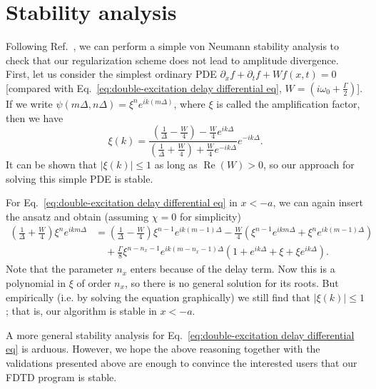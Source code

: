 \documentclass[final,1p,times]{elsarticle}
\DeclareMathOperator{\re}{Re}
\begin{document}
\appendix
\section{Stability analysis}
\label{appen: stability}
Following Ref.~\cite{NumericalRecipes}, we can perform a simple von Neumann stability analysis to check that our regularization scheme does not lead to amplitude divergence. First, let us consider the simplest ordinary PDE $\partial_x f+\partial_t f+W f(x,t)=0$ [compared with Eq.~\eqref{eq:double-excitation delay differential eq}, $W=\left(i\omega_0+\frac{\Gamma}{2}\right)$]. If we write $\psi(m\Delta, n\Delta)=\xi^n e^{ik(m\Delta)}$, where $\xi$ is called the amplification factor, then we have 
\begin{equation}
\xi(k) = \frac{\left(\frac{1}{\Delta}-\frac{W}{4}\right)-\frac{W}{4}e^{ik\Delta}}{\left(\frac{1}{\Delta}+\frac{W}{4}\right)+\frac{W}{4}e^{-ik\Delta}}e^{-ik\Delta}.
\end{equation}
It can be shown that $|\xi(k)|\leq 1$ as long as $\re(W)>0$, so our approach for solving this simple PDE is stable.

For Eq.~\eqref{eq:double-excitation delay differential eq} in $x<-a$, we can again insert the ansatz and obtain
(assuming $\chi=0$ for simplicity)
\begin{align}
\left(\frac{1}{\Delta}+\frac{W}{4}\right)\xi^n e^{ikm\Delta}
&=	\left(\frac{1}{\Delta}-\frac{W}{4}\right)\xi^{n-1} e^{ik(m-1)\Delta}
-\frac{W}{4}\left(\xi^{n-1}e^{ikm\Delta}+\xi^{n}e^{ik(m-1)\Delta}\right)\nonumber\\
&\quad+\frac{\Gamma}{8}\xi^{n-n_x-1}e^{ik(m-n_x-1)\Delta}\left(1+e^{ik\Delta}+\xi+\xi e^{ik\Delta}\right).
\end{align}
Note that the parameter $n_x$ enters because of the delay term. Now this is a polynomial in $\xi$ of order $n_x$, so there is no general solution for its roots. But empirically (i.e. by solving the equation graphically) we still find that $|\xi(k)|\leq 1$; that is, our algorithm is stable in $x<-a$.

A more general stability analysis for Eq.~\eqref{eq:double-excitation delay differential eq} is arduous. However, we hope the above reasoning together with the validations presented above are enough to convince the interested users that our FDTD program is stable. 
\end{document}
